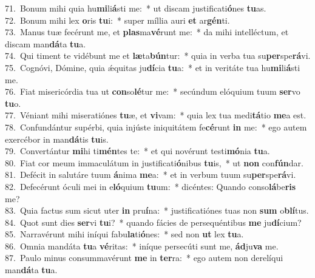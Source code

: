 {71.~}Bonum mihi quia hu\textbf{mi}li\textbf{á}sti me:~* ut discam justificati\textbf{ó}nes \textbf{tu}as.\\
{72.~}Bonum mihi lex \textbf{o}ris \textbf{tu}i:~* super míllia auri \textbf{et} ar\textbf{gén}ti.\\
{73.~}Manus tuæ fecérunt me, et \textbf{plas}ma\textbf{vé}runt me:~* da mihi intelléctum, et discam man\textbf{dá}ta \textbf{tu}a.\\
{74.~}Qui timent te vidébunt me et \textbf{læ}ta\textbf{bún}tur:~* quia in verba tua su\textbf{per}spe\textbf{rá}vi.\\
{75.~}Cognóvi, Dómine, quia ǽquitas ju\textbf{dí}cia \textbf{tu}a:~* et in veritáte tua hu\textbf{mi}li\textbf{á}sti me.\\
{76.~}Fiat misericórdia tua ut \textbf{con}so\textbf{lé}tur me:~* secúndum elóquium tuum \textbf{ser}vo \textbf{tu}o.\\
{77.~}Véniant mihi miseratiónes \textbf{tu}æ, et \textbf{vi}vam:~* quia lex tua medi\textbf{tá}tio \textbf{me}a est.\\
{78.~}Confundántur supérbi, quia injúste iniquitátem fe\textbf{cé}runt \textbf{in} me:~* ego autem exercébor in man\textbf{dá}tis \textbf{tu}is.\\
{79.~}Convertántur \textbf{mi}hi ti\textbf{mén}tes te:~* et qui novérunt testi\textbf{mó}nia \textbf{tu}a.\\
{80.~}Fiat cor meum immaculátum in justificati\textbf{ó}nibus \textbf{tu}is,~* ut \textbf{non} con\textbf{fún}dar.\\
{81.~}Defécit in salutáre tuum \textbf{á}nima \textbf{me}a:~* et in verbum tuum su\textbf{per}spe\textbf{rá}vi.\\
{82.~}Defecérunt óculi mei in e\textbf{ló}quium \textbf{tu}um:~* dicéntes: Quando conso\textbf{lá}be\textbf{ris} me?\\
{83.~}Quia factus sum sicut uter \textbf{in} pru\textbf{í}na:~* justificatiónes tuas non \textbf{sum} o\textbf{blí}tus.\\
{84.~}Quot sunt dies \textbf{ser}vi \textbf{tu}i?~* quando fácies de persequéntibus \textbf{me} ju\textbf{dí}cium?\\
{85.~}Narravérunt mihi iníqui fabu\textbf{la}ti\textbf{ó}nes:~* sed non \textbf{ut} lex \textbf{tu}a.\\
{86.~}Omnia mandáta \textbf{tu}a \textbf{vé}ritas:~* iníque persecúti sunt me, \textbf{ád}ju\textbf{va} me.\\
{87.~}Paulo minus consummavérunt \textbf{me} in \textbf{ter}ra:~* ego autem non derelíqui man\textbf{dá}ta \textbf{tu}a.\\
